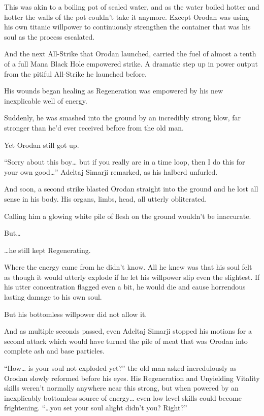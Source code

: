 \documentclass[a4paper,10pt]{book}
\begin{document}
This was akin to a boiling pot of sealed water, and as the water boiled hotter and hotter the walls of the pot couldn’t take it anymore. Except Orodan was using his own titanic willpower to continuously strengthen the container that was his soul as the process escalated.\par
And the next All-Strike that Orodan launched, carried the fuel of almost a tenth of a full Mana Black Hole empowered strike. A dramatic step up in power output from the pitiful All-Strike he launched before.\par
His wounds began healing as Regeneration was empowered by his new inexplicable well of energy.\par
Suddenly, he was smashed into the ground by an incredibly strong blow, far stronger than he’d ever received before from the old man.\par
Yet Orodan still got up.\par
“Sorry about this boy… but if you really are in a time loop, then I do this for your own good…” Adeltaj Simarji remarked, as his halberd unfurled.\par
And soon, a second strike blasted Orodan straight into the ground and he lost all sense in his body. His organs, limbs, head, all utterly obliterated.\par
Calling him a glowing white pile of flesh on the ground wouldn’t be inaccurate.\par
But…\par
…he still kept Regenerating.\par
Where the energy came from he didn’t know. All he knew was that his soul felt as though it would utterly explode if he let his willpower slip even the slightest. If his utter concentration flagged even a bit, he would die and cause horrendous lasting damage to his own soul.\par
But his bottomless willpower did not allow it.\par
And as multiple seconds passed, even Adeltaj Simarji stopped his motions for a second attack which would have turned the pile of meat that was Orodan into complete ash and base particles.\par
“How… is your soul not exploded yet?” the old man asked incredulously as Orodan slowly reformed before his eyes. His Regeneration and Unyielding Vitality skills weren’t normally anywhere near this strong, but when powered by an inexplicably bottomless source of energy… even low level skills could become frightening. “…you set your soul alight didn’t you? Right?”\par
\end{document}
